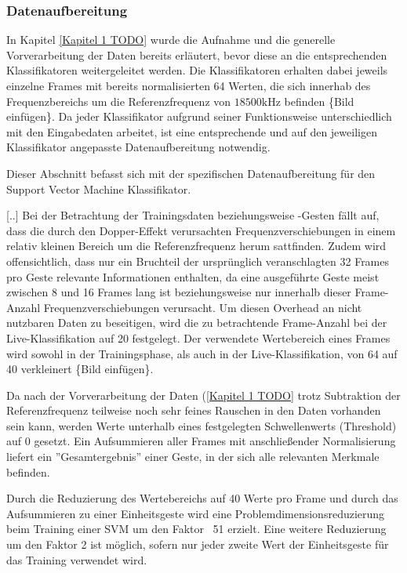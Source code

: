 
\subsubsection{Datenaufbereitung}
In Kapitel \ref{Kapitel 1 TODO} wurde die Aufnahme und die generelle Vorverarbeitung der Daten bereits erläutert, bevor diese an die entsprechenden Klassifikatoren weitergeleitet werden.
Die Klassifikatoren erhalten dabei jeweils einzelne Frames mit bereits normalisierten 64 Werten, die sich innerhab des Frequenzbereichs um die Referenzfrequenz von $18500\text{kHz}$ befinden  \{Bild einfügen\}. 
Da jeder Klassifikator aufgrund seiner Funktionsweise unterschiedlich mit den Eingabedaten arbeitet, ist eine entsprechende und auf den jeweiligen Klassifikator angepasste Datenaufbereitung notwendig.

Dieser Abschnitt befasst sich mit der spezifischen Datenaufbereitung für den Support Vector Machine Klassifikator.

[..]
Bei der Betrachtung der Trainingsdaten beziehungsweise -Gesten fällt auf, dass die durch den Dopper-Effekt verursachten Frequenzverschiebungen in einem relativ kleinen Bereich um die Referenzfrequenz herum sattfinden.
Zudem wird offensichtlich, dass nur ein Bruchteil der ursprünglich veranschlagten 32 Frames pro Geste relevante Informationen enthalten, da eine ausgeführte Geste meist zwischen 8 und 16 Frames lang ist beziehungsweise nur innerhalb dieser Frame-Anzahl Frequenzverschiebungen verursacht.
Um diesen Overhead an nicht nutzbaren Daten zu beseitigen, wird die zu betrachtende Frame-Anzahl bei der Live-Klassifikation auf 20 festgelegt.
Der verwendete Wertebereich eines Frames wird sowohl in der Trainingsphase, als auch in der Live-Klassifikation, von 64 auf 40 verkleinert \{Bild einfügen\}. 

Da nach der Vorverarbeitung der Daten (\ref{Kapitel 1 TODO} trotz Subtraktion der Referenzfrequenz teilweise noch sehr feines Rauschen in den Daten vorhanden sein kann, werden Werte unterhalb eines festgelegten Schwellenwerts (Threshold) auf 0 gesetzt.
Ein Aufsummieren aller Frames mit anschließender Normalisierung liefert ein ''Gesamtergebnis'' einer Geste, in der sich alle relevanten Merkmale befinden.

Durch die Reduzierung des Wertebereichs auf 40 Werte pro Frame und durch das Aufsummieren zu einer Einheitsgeste wird eine Problemdimensionsreduzierung beim Training einer SVM um den Faktor ~51 erzielt.
Eine weitere Reduzierung um den Faktor 2 ist möglich, sofern nur jeder zweite Wert der Einheitsgeste für das Training verwendet wird.


